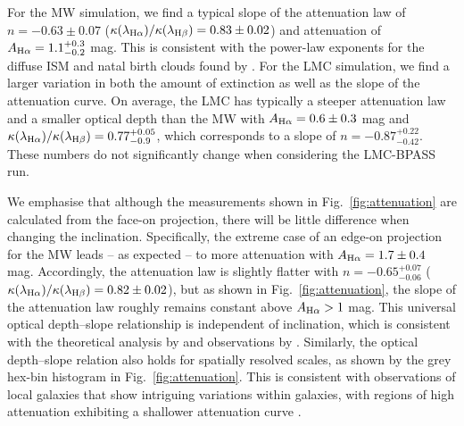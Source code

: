 \documentclass[fleqn,usenatbib]{mnras}
\begin{document}
For the MW simulation, we find a typical slope of the attenuation law of $n=-0.63\pm0.07$ ($\kappa(\lambda_{\rm H\alpha})/\kappa(\lambda_{\rm H\beta})=0.83\pm0.02$) and attenuation of $A_{\rm H\alpha}=1.1_{-0.2}^{+0.3}$ mag. This is consistent with the power-law exponents for the diffuse ISM and natal birth clouds found by \citet{charlot00}. For the LMC simulation, we find a larger variation in both the amount of extinction as well as the slope of the attenuation curve. On average, the LMC has typically a steeper attenuation law and a smaller optical depth than the MW with $A_{\rm H\alpha}=0.6\pm0.3$ mag and $\kappa(\lambda_{\rm H\alpha})/\kappa(\lambda_{\rm H\beta})=0.77_{-0.9}^{+0.05}$, which corresponds to a slope of $n=-0.87^{+0.22}_{-0.42}$. These numbers do not significantly change when considering the LMC-BPASS run.

We emphasise that although the measurements shown in Fig.~\ref{fig:attenuation} are calculated from the face-on projection, there will be little difference when changing the inclination. Specifically, the extreme case of an edge-on projection for the MW leads -- as expected -- to more attenuation with $A_{\rm H\alpha}=1.7\pm0.4$ mag. Accordingly, the attenuation law is slightly flatter with $n=-0.65^{+0.07}_{-0.06}$ ($\kappa(\lambda_{\rm H\alpha})/\kappa(\lambda_{\rm H\beta})=0.82\pm0.02$), but as shown in Fig.~\ref{fig:attenuation}, the slope of the attenuation law roughly remains constant above $A_{\rm H\alpha}>1$ mag. This universal optical depth--slope relationship is independent of inclination, which is consistent with the theoretical analysis by \citet{chevallard13} and observations by \citet[][see also \citealt{salim20} for a review]{salim18_curves}. Similarly, the optical depth--slope relation also holds for spatially resolved scales, as shown by the grey hex-bin histogram in Fig.~\ref{fig:attenuation}. This is consistent with observations of local galaxies that show intriguing variations within galaxies, with regions of high attenuation exhibiting a shallower attenuation curve \citep{decleir19}.
\end{document}
